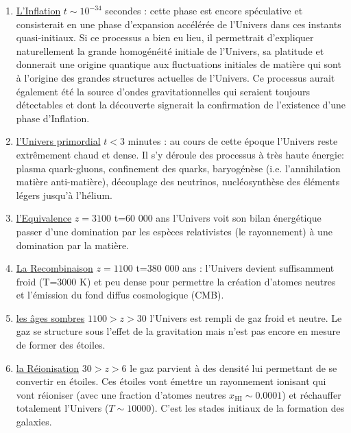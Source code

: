 \begin{enumerate}
\item \underline{L'Inflation} $t\sim 10^{-34}$ secondes :  cette phase est encore spéculative et consisterait en une phase d'expansion accélérée de l'Univers dans ces instants quasi-initiaux. Si ce processus a bien eu lieu, il permettrait d'expliquer naturellement la grande homogénéité initiale de l'Univers, sa platitude et donnerait une origine quantique aux fluctuations initiales de matière qui sont à l'origine des grandes structures actuelles de l'Univers. Ce processus aurait également été la source d'ondes gravitationnelles qui seraient toujours détectables et dont la découverte signerait la confirmation de l'existence d'une phase d'Inflation.
\item \underline{l'Univers primordial} $t<3$ minutes : au cours de cette époque l'Univers reste extrêmement chaud et dense. Il s'y déroule des processus à très haute énergie: plasma quark-gluons, confinement des quarks, baryogénèse (i.e. l'annihilation matière anti-matière), découplage des neutrinos, nucléosynthèse des éléments légers jusqu'à l'hélium.
\item \underline{l'Equivalence} $z=3100$ t=60 000 ans  l'Univers voit son bilan énergétique passer d'une domination par les espèces relativistes (le rayonnement) à une domination par la matière.
\item \underline{La Recombinaison} $z=1100$ t=380 000 ans : l'Univers devient suffisamment froid (T=3000 K) et peu dense pour permettre la création d'atomes neutres et l'émission du fond diffus cosmologique (CMB). 
\item \underline{les âges sombres} $1100>z>30$  l'Univers est rempli de gaz froid et neutre. Le gaz se structure sous l'effet de la gravitation mais  n'est pas encore en mesure de former des étoiles. 
\item \underline{la Réionisation} $30>z>6$ le gaz parvient à des densité lui permettant de se convertir en étoiles. Ces étoiles vont émettre un rayonnement ionisant qui vont réioniser (avec une fraction d'atomes neutres $x_\mathrm{HI}\sim0.0001$) et réchauffer totalement l'Univers ($T\sim 10000$). C'est les stades initiaux de la formation des galaxies.

\end{enumerate}

